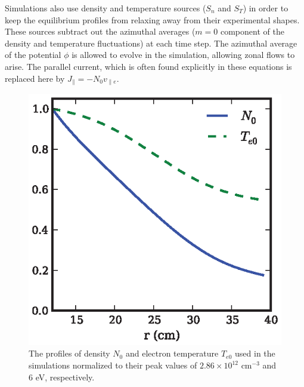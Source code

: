 \documentclass[showpacs,preprintnumbers,amsmath,amssymb,superscriptaddress]{revtex4}
\def\para{\parallel}
\newcommand{\vpe}{v_{\parallel e}}
\begin{document}
Simulations also use density and temperature sources ($S_n$ and $S_T$) in order to keep the equilibrium profiles from relaxing away from their experimental shapes. 
These sources subtract out the azimuthal averages ($m=0$ component of the density and temperature fluctuations) at each time step. 
The azimuthal average of the potential $\phi$ is allowed to evolve in
the simulation, allowing zonal flows to arise.
The parallel current, which is often found explicitly in these equations is replaced here by $J_\para = - N_0 \vpe$. \\

\begin{figure}[!htbp]
\includegraphics[]{equilibrium_profiles}
\hfil
\caption{The profiles of density $N_0$ and electron temperature $T_{e0}$ used in the simulations normalized to their peak values of $2.86 \times 10^{12}$ cm$^{-3}$ and 
$6$ eV, respectively.}
\label{eq_profiles}
\end{figure}
\end{document}
